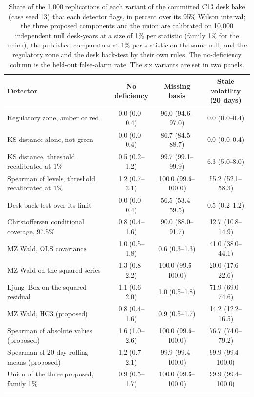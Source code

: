 \begin{table}[htbp]
\centering
\footnotesize
\renewcommand{\arraystretch}{1.1}
\caption{Share of the 1,000 replications of each variant of the committed C13 desk bake (case seed 13) that each detector flags, in percent over its 95\% Wilson interval; the three proposed components and the union are calibrated on 10,000 independent null desk-years at a size of 1\% per statistic (family 1\% for the union), the published comparators at 1\% per statistic on the same null, and the regulatory zone and the desk back-test by their own rules. The no-deficiency column is the held-out false-alarm rate. The six variants are set in two panels.}
\label{tab:main-results}
\begin{tabular}{>{\raggedright\arraybackslash}p{5.2cm}ccc}
\toprule
Detector & \shortstack{No\\deficiency} & \shortstack{Missing\\basis} & \shortstack{Stale volatility\\(20 days)} \\
\midrule
Regulatory zone, amber or red & 0.0 (0.0--0.4) & 96.0 (94.6--97.0) & 0.0 (0.0--0.4) \\ \addlinespace[0.8ex]
KS distance alone, not green & 0.0 (0.0--0.4) & 86.7 (84.5--88.7) & 0.0 (0.0--0.4) \\ \addlinespace[0.8ex]
KS distance, threshold recalibrated at 1\% & 0.5 (0.2--1.2) & 99.7 (99.1--99.9) & 6.3 (5.0--8.0) \\ \addlinespace[0.8ex]
Spearman of levels, threshold recalibrated at 1\% & 1.2 (0.7--2.1) & 100.0 (99.6--100.0) & 55.2 (52.1--58.3) \\ \addlinespace[0.8ex]
Desk back-test over its limit & 0.0 (0.0--0.4) & 56.5 (53.4--59.5) & 0.5 (0.2--1.2) \\ \addlinespace[0.8ex]
Christoffersen conditional coverage, 97.5\% & 0.8 (0.4--1.6) & 90.0 (88.0--91.7) & 12.7 (10.8--14.9) \\ \addlinespace[0.8ex]
MZ Wald, OLS covariance & 1.0 (0.5--1.8) & 0.6 (0.3--1.3) & 41.0 (38.0--44.1) \\ \addlinespace[0.8ex]
MZ Wald on the squared series & 1.3 (0.8--2.2) & 100.0 (99.6--100.0) & 20.0 (17.6--22.6) \\ \addlinespace[0.8ex]
Ljung--Box on the squared residual & 1.1 (0.6--2.0) & 1.0 (0.5--1.8) & 71.9 (69.0--74.6) \\ \addlinespace[0.8ex]
MZ Wald, HC3 (proposed) & 0.8 (0.4--1.6) & 0.9 (0.5--1.7) & 14.2 (12.2--16.5) \\ \addlinespace[0.8ex]
Spearman of absolute values (proposed) & 1.6 (1.0--2.6) & 100.0 (99.6--100.0) & 76.7 (74.0--79.2) \\ \addlinespace[0.8ex]
Spearman of 20-day rolling means (proposed) & 1.2 (0.7--2.1) & 99.9 (99.4--100.0) & 99.9 (99.4--100.0) \\ \addlinespace[0.8ex]
Union of the three proposed, family 1\% & 0.9 (0.5--1.7) & 100.0 (99.6--100.0) & 99.9 (99.4--100.0) \\ \addlinespace[0.8ex]
\bottomrule
\end{tabular}


\end{table}
